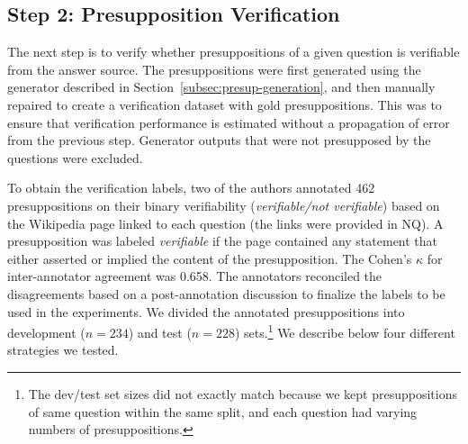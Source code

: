 \documentclass[11pt,a4paper]{article}
\begin{document}
\begin{table*}[t]
    \centering
    \caption{Performance of verification models tested. Models marked with `Wiki sentence' use sentences from Wikipedia articles as premises, and `Wiki presuppositions', generated presuppositions from Wikipedia sentences.}
    \label{table:verification-results}
\end{table*}

\subsection{Step 2: Presupposition Verification}
The next step is to verify whether presuppositions of a given question is verifiable from the answer source. The presuppositions were first generated using the generator described in Section~\ref{subsec:presup-generation}, and then manually repaired to create a verification dataset with gold presuppositions. This was to ensure that verification performance is estimated without a propagation of error from the previous step. Generator outputs that were not presupposed by the questions were excluded.

To obtain the verification labels, two of the authors annotated 462 presuppositions on their binary verifiability (\textit{verifiable/not verifiable}) based on the Wikipedia page linked to each question (the links were provided in NQ). A presupposition was labeled \textit{verifiable} if the page contained any statement that either asserted or implied the content of the presupposition. The Cohen's $\kappa$ for inter-annotator agreement was 0.658. The annotators reconciled the disagreements based on a post-annotation discussion to finalize the labels to be used in the experiments. We divided the annotated presuppositions into development ($n=234$) and test ($n=228$) sets.\footnote{The dev/test set sizes did not exactly match because we kept presuppositions of same question within the same split, and each question had varying numbers of presuppositions.} We describe below four different strategies we tested.
\end{document}

